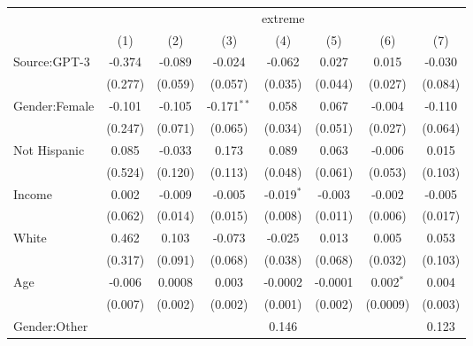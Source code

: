 
\begingroup
\centering
\begin{tabular}{lccccccc}
   \toprule
    & \multicolumn{7}{c}{extreme}\\
                            & (1)           & (2)           & (3)           & (4)           & (5)           & (6)           & (7)\\  
   \midrule 
   Source:GPT-3             & -0.374        & -0.089        & -0.024        & -0.062        & 0.027         & 0.015         & -0.030\\   
                            & (0.277)       & (0.059)       & (0.057)       & (0.035)       & (0.044)       & (0.027)       & (0.084)\\   
   Gender:Female            & -0.101        & -0.105        & -0.171$^{**}$ & 0.058         & 0.067         & -0.004        & -0.110\\   
                            & (0.247)       & (0.071)       & (0.065)       & (0.034)       & (0.051)       & (0.027)       & (0.064)\\   
   Not Hispanic             & 0.085         & -0.033        & 0.173         & 0.089         & 0.063         & -0.006        & 0.015\\   
                            & (0.524)       & (0.120)       & (0.113)       & (0.048)       & (0.061)       & (0.053)       & (0.103)\\   
   Income                   & 0.002         & -0.009        & -0.005        & -0.019$^{*}$  & -0.003        & -0.002        & -0.005\\   
                            & (0.062)       & (0.014)       & (0.015)       & (0.008)       & (0.011)       & (0.006)       & (0.017)\\   
   White                    & 0.462         & 0.103         & -0.073        & -0.025        & 0.013         & 0.005         & 0.053\\   
                            & (0.317)       & (0.091)       & (0.068)       & (0.038)       & (0.068)       & (0.032)       & (0.103)\\   
   Age                      & -0.006        & 0.0008        & 0.003         & -0.0002       & -0.0001       & 0.002$^{*}$   & 0.004\\   
                            & (0.007)       & (0.002)       & (0.002)       & (0.001)       & (0.002)       & (0.0009)      & (0.003)\\   
   Gender:Other             &               &               &               & 0.146         &               &               & 0.123\\   

\end{tabular}
